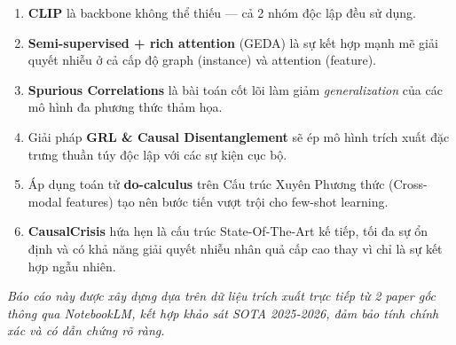 \documentclass[12pt,a4paper]{article}
\begin{document}
\begin{insightbox}
\begin{enumerate}[leftmargin=*]
  \item \textbf{CLIP} là backbone không thể thiếu — cả 2 nhóm độc lập đều sử dụng.
  \item \textbf{Semi-supervised + rich attention} (GEDA) là sự kết hợp mạnh mẽ giải quyết nhiễu ở cả cấp độ graph (instance) và attention (feature).
  \item \textbf{Spurious Correlations} là bài toán cốt lõi làm giảm \textit{generalization} của các mô hình đa phương thức thảm họa.
  \item Giải pháp \textbf{GRL \& Causal Disentanglement} sẽ ép mô hình trích xuất đặc trưng thuần túy độc lập với các sự kiện cục bộ.
  \item Áp dụng toán tử \textbf{do-calculus} trên Cấu trúc Xuyên Phương thức (Cross-modal features) tạo nên bước tiến vượt trội cho few-shot learning.
  \item \textbf{CausalCrisis} hứa hẹn là cấu trúc State-Of-The-Art kế tiếp, tối đa sự ổn định và có khả năng giải quyết nhiễu nhân quả cấp cao thay vì chỉ là sự kết hợp ngẫu nhiên.
\end{enumerate}
\end{insightbox}

\vspace{0.5cm}
\noindent\textit{Báo cáo này được xây dựng dựa trên dữ liệu trích xuất trực tiếp từ 2 paper gốc thông qua NotebookLM, kết hợp khảo sát SOTA 2025-2026, đảm bảo tính chính xác và có dẫn chứng rõ ràng.}
\end{document}

